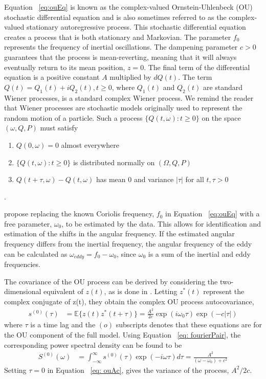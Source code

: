 \documentclass{stat572Style}
\begin{document}
Equation ~\ref{eq:ouEq}  is known as the complex-valued Ornstein-Uhlenbeck (OU) stochastic differential equation and is also sometimes referred to as the complex-valued stationary autoregressive process. This stochastic differential equation creates a process  that is both stationary and Markovian. The parameter $f_{0}$ represents the frequency of inertial oscillations. The dampening parameter $c > 0$  guarantees that the process is mean-reverting, meaning that it will always eventually return to its mean position, $z = 0$.   The final term of the differential equation is a positive constant $A$ multiplied by $dQ(t)$.  The term $Q(t) = Q_{1}(t) + i Q_{2}(t), t \geq 0$, where $Q_{1}(t)$ and $Q_{2}(t)$ are standard Wiener processes, is a standard complex Wiener process. We remind the reader that Wiener processes are stochastic models originally used to represent the random motion of a particle. Such a process $\{Q(t, \omega): t \geq 0\}$ on the space $(\omega, Q, P)$ must satisfy
\begin{enumerate}
\item $Q(0, \omega) = 0$ almost everywhere
\item $\{Q(t, \omega): t \geq 0\}$ is distributed normally on $(\Omega,Q, P)$
\item $Q(t + \tau, \omega) - Q(t, \omega)$ has mean 0 and variance $|\tau|$ for all $t, \tau > 0$
\end{enumerate}
\citep{Hida1980}. 

\citet{Sykulski2016} propose replacing the known Coriolis frequency, $f_{0}$  in Equation ~\ref{eq:ouEq} with  a free parameter, $\omega_{0}$, to be estimated by the data. This allows for identification and estimation of the shifts in the angular frequency. If the estimated angular frequency differs from the inertial frequency, the angular frequency of the eddy can be calculated as $\omega_{eddy} = f_{0} - \omega_{0}$, since $\omega_{0}$ is a sum of the inertial and eddy frequencies.


The covariance of the OU process can be derived by considering the two-dimensional equivalent of $z(t)$, as is done in  \citet{Arato1999}. Letting $z^{*}(t)$ represent the complex conjugate of z(t), they obtain the complex OU process autocovariance,
\begin{align}
\label{eq:ouAC}
s^{(0)}(\tau) &= \mathbb{E}\{z(t)z^{*}(t + \tau) \} = \frac{A^{2}}{2c} \exp(i \omega_{0}\tau) \exp(-c|\tau|)
\end{align}
where $\tau$ is a time lag and the $(o)$ subscripts denotes that these equations are for the OU component of the full model.  Using Equation ~\ref{eq: fourierPair}, the corresponding power spectral density can be found to be\begin{align}
\label{eq:ouPSD}
S^{(0)}(\omega) &= \int_{-\infty}^{\infty} s^{(0)}(\tau) \exp (-i \omega \tau) d \tau = \frac{A^{2}}{(\omega - \omega_{0}) + c^{2}}
\end{align}
\noindent Setting $\tau = 0$ in Equation ~\ref{eq: ouAc}, gives the variance of the process, $A^{2}/2c$.
\end{document}
